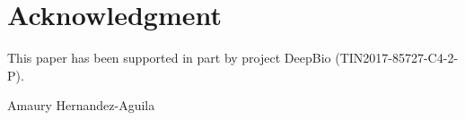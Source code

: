 ﻿\documentclass{ieeeaccess}
\begin{document}
\section*{Acknowledgment}
This paper has been supported in part by project DeepBio (TIN2017-85727-C4-2-P).

\begin{IEEEbiography}{Amaury
  Hernandez-Aguila} 
\end{IEEEbiography}




\EOD
\end{document}
